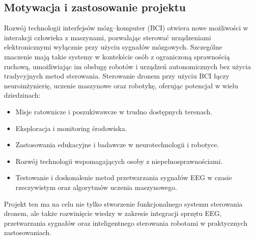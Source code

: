 \subsection{Motywacja i zastosowanie projektu}
Rozwój technologii interfejsów mózg–komputer (BCI) otwiera nowe możliwości w interakcji człowieka z maszynami, pozwalając sterować urządzeniami elektronicznymi wyłącznie przy użyciu sygnałów mózgowych. Szczególne znaczenie mają takie systemy w kontekście osób z ograniczoną sprawnością ruchową, umożliwiając im obsługę robotów i urządzeń autonomicznych bez użycia tradycyjnych metod sterowania. Sterowanie dronem przy użyciu BCI łączy neuroinżynierię, uczenie maszynowe oraz robotykę, oferując potencjał w wielu dziedzinach:
\begin{itemize}
    \item Misje ratownicze i poszukiwawcze w trudno dostępnych terenach.
    \item Eksploracja i monitoring środowiska.
    \item Zastosowania edukacyjne i badawcze w neurotechnologii i robotyce.
    \item Rozwój technologii wspomagających osoby z niepełnosprawnościami.
    \item Testowanie i doskonalenie metod przetwarzania sygnałów EEG w czasie rzeczywistym oraz algorytmów uczenia maszynowego.
\end{itemize}
Projekt ten ma na celu nie tylko stworzenie funkcjonalnego systemu sterowania dronem, ale także rozwinięcie wiedzy w zakresie integracji sprzętu EEG, przetwarzania sygnałów oraz inteligentnego sterowania robotami w praktycznych zastosowaniach.